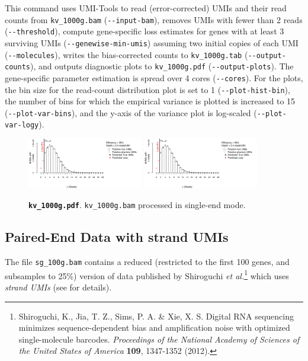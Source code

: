\documentclass[a4paper]{scrartcl}
\makeatletter
\let\subsection@phlo\subsection
\renewcommand\subsection{\needspace{5\baselineskip}\subsection@phlo}
\newcommand{\ddarg}[1]{\texttt{-{}-#1}}
\DeclareRobustCommand*{\nameref}[1]{%
      \textit{\my@nameref{#1}}%
    }%
\makeatother
\begin{document}
This command uses UMI-Tools to read (error-corrected) UMIs and their read counts from \texttt{kv\_1000g.bam} (\ddarg{input-bam}), removes UMIs with fewer than 2 reads (\ddarg{threshold}), compute gene-specific loss estimates for genes with at least 3 surviving UMIs (\ddarg{genewise-min-umis}) assuming two initial copies of each UMI (\ddarg{molecules}), writes the bias-corrected counts to \texttt{kv\_1000g.tab} (\ddarg{output-counts}), and outputs diagnostic plots to \texttt{kv\_1000g.pdf} (\ddarg{output-plots}). The gene-specific parameter estimation is spread over 4 cores (\ddarg{cores}). For the plots, the bin size for the read-count distribution plot is set to 1 (\ddarg{plot-hist-bin}), the number of bins for which the empirical variance is plotted is increased to 15 (\ddarg{plot-var-bins}), and the y-axis of the variance plot is log-scaled (\ddarg{plot-var-logy}).

\begin{figure}[H]
{\centering
\includegraphics[width=0.45\textwidth,page=1]{../examples/kv_1000g.pdf}\hfill
\includegraphics[width=0.45\textwidth,page=2]{../examples/kv_1000g.pdf}
\\}
\caption*{\textbf{\texttt{kv\_1000g.pdf}}. \texttt{kv\_1000g.bam} processed in single-end mode.}
\end{figure}

\subsection{Paired-End Data with strand UMIs}

The file \texttt{sg\_100g.bam} contains a reduced (restricted to the first 100 genes, and subsamples to 25\%) version of data published by Shiroguchi \textit{et al.}\footnote{Shiroguchi, K., Jia, T. Z., Sims, P. A. \& Xie, X. S. Digital RNA sequencing minimizes sequence-dependent bias and amplification noise with optimized single-molecule barcodes. \textit{Proceedings of the National Academy of Sciences of the United States of America} \textbf{109}, 1347-1352 (2012).} which uses \emph{strand UMIs} (see \nameref{strand-umis} for details).
\end{document}
